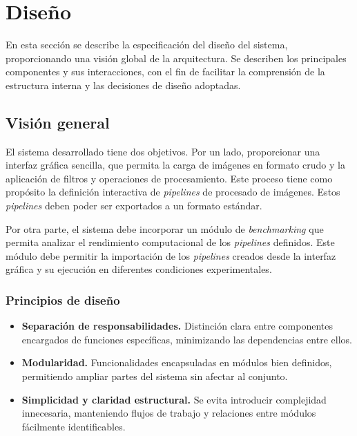 \section{Diseño} \label{sec:7_diseno}
En esta sección se describe la especificación del diseño del sistema, proporcionando 
una visión global de la arquitectura. Se describen los principales
componentes y sus interacciones, con el fin de facilitar la comprensión de la estructura 
interna y las decisiones de diseño adoptadas.

\subsection{Visión general} \label{subsec:7_1_visión_general}
El sistema desarrollado tiene dos objetivos. Por un lado, proporcionar una interfaz 
gráfica sencilla, que permita la carga de imágenes en formato crudo y la aplicación de
filtros y operaciones de procesamiento. Este proceso tiene como propósito la definición 
interactiva de \textit{pipelines} de procesado de imágenes. Estos \textit{pipelines} 
deben poder ser exportados a un formato estándar. 

Por otra parte, el sistema debe incorporar un módulo de \textit{benchmarking}
que permita analizar el rendimiento computacional de los \textit{pipelines} definidos. 
Este módulo debe permitir la importación de los \textit{pipelines} creados desde la 
interfaz gráfica y su ejecución en diferentes condiciones experimentales.

\subsubsection{Principios de diseño} \label{subsubsec:7_1_1_principios_de_diseno}

\begin{itemize}[noitemsep]
    \item \textbf{Separación de responsabilidades.} Distinción clara entre componentes
    encargados de funciones específicas, minimizando las dependencias entre ellos.
    \item \textbf{Modularidad.} Funcionalidades encapsuladas en módulos bien 
    definidos, permitiendo ampliar partes del sistema sin afectar al conjunto.
    \item \textbf{Simplicidad y claridad estructural.} Se evita introducir complejidad innecesaria, 
    manteniendo flujos de trabajo y relaciones entre módulos fácilmente identificables.
\end{itemize}

